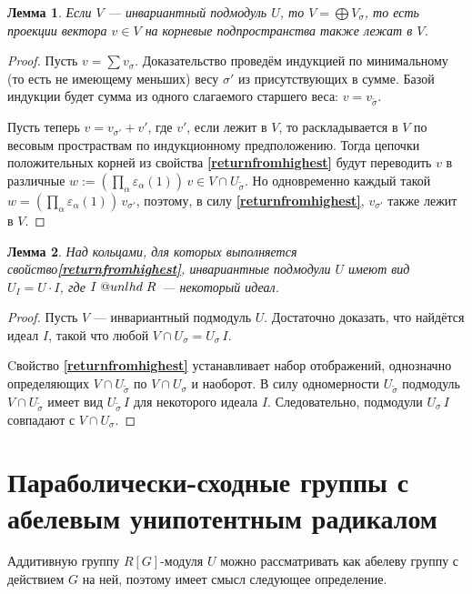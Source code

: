 \documentclass[12pt]{matmex-diploma}
\makeatletter
\newcommand{\slunlhd}{%
  \mathrel{\mathpalette\sl@unlhd\relax}%
}
\newcommand{\sl@unlhd}[2]{%
  \sbox\z@{$#1\lhd$}%
  \sbox\tw@{$#1\leqslant$}%
  \dimen@=\ht\tw@
  \advance\dimen@-\ht\z@
  \ifx#1\displaystyle
    \advance\dimen@ .2pt
  \else
    \ifx#1\textstyle
      \advance\dimen@ .2pt
    \fi
  \fi
  \ooalign{\raisebox{\dimen@}{$\m@th#1\lhd$}\cr$\m@th#1\leqslant$\cr}%
}
\theoremstyle{mystyleni}
\theoremstyle{mystyle}
\newtheorem{lm}{Лемма}
\newcommand\refb[1]{\textbf{\ref{#1}}}
\renewcommand{\trianglelefteq}{\slunlhd}
\makeatother
\begin{document}
\begin{lm}\label{weightprojections}
Если $V$ --- инвариантный подмодуль $U$, то $V = \bigoplus V_\sigma$, то есть проекции вектора $v \in V$ на корневые подпространства также лежат в $V$.
\end{lm}
\begin{proof}
Пусть $v = \sum v_\sigma$. Доказательство проведём индукцией по минимальному (то есть не имеющему меньших) весу $\sigma'$ из присутствующих в сумме. Базой индукции будет сумма из одного слагаемого старшего веса: $v = v_{\widetilde\sigma}$.

Пусть теперь $v = v_{\sigma'} + v'$, где $v'$, если лежит в $V$, то раскладывается в $V$ по весовым простраствам по индукционному предположению. Тогда цепочки положительных корней из свойства \refb{returnfromhighest} будут переводить $v$ в различные $w := \left(\prod_{\alpha}\varepsilon_\alpha(1)\right) \, v \in V \cap U_{\widetilde\sigma}$. Но одновременно каждый такой $w = \left(\prod_{\alpha}\varepsilon_\alpha(1)\right) \, v_{\sigma'}$, поэтому, в силу \refb{returnfromhighest}, $v_{\sigma'}$ также лежит в $V$.
\end{proof}

\begin{lm}\label{unipotentsubgroups}
Над кольцами, для которых выполняется свойство\refb{returnfromhighest}, инвариантные подмодули $U$ имеют вид $U_I = U \cdot I$, где $I \trianglelefteq R$ --- некоторый идеал.
\end{lm}
\begin{proof}
Пусть $V$ --- инвариантный подмодуль $U$. Достаточно доказать, что найдётся идеал $I$, такой что любой $V \cap U_\sigma = U_\sigma \, I$.

Cвойство \refb{returnfromhighest} устанавливает набор отображений, однозначно определяющих $V \cap U_{\widetilde\sigma}$ по $V \cap U_\sigma$ и наоборот. В силу одномерности $U_{\widetilde\sigma}$ подмодуль $V \cap U_{\widetilde\sigma}$ имеет вид $U_{\widetilde\sigma} \, I$ для некоторого идеала $I$. Следовательно, подмодули $U_{\sigma} \, I$ совпадают с $V \cap U_\sigma$.
\end{proof}


\section{Параболически-сходные группы с абелевым унипотентным радикалом}

Аддитивную группу $R[G]$-модуля $U$ можно рассматривать как абелеву группу с действием $G$ на ней, поэтому
имеет смысл следующее определение.
\end{document}
